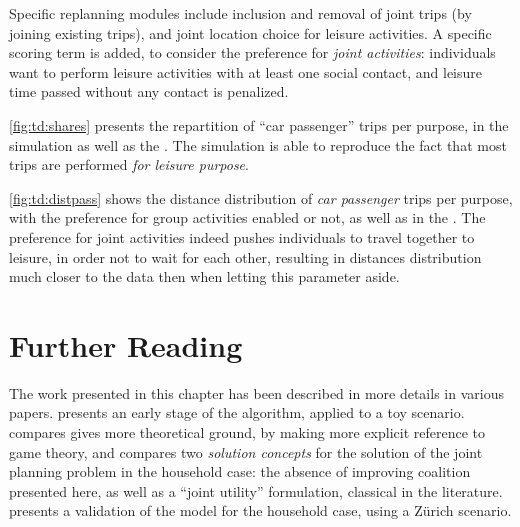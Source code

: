 {Specific replanning modules include inclusion and removal of joint trips (by joining existing trips),
and joint location choice for leisure activities.
A specific scoring term is added, to consider the preference for \emph{joint activities}:
individuals want to perform leisure activities with at least one social contact,
and leisure time passed without any contact is penalized.

\cref{fig:td:shares} presents the repartition of ``car passenger'' trips per purpose,
in the simulation as well as the \mz.
The simulation is able to reproduce the fact that most trips are performed
\emph{for leisure purpose}.


\cref{fig:td:distpass} shows the distance distribution of \emph{car passenger} trips per purpose,
with the preference for group activities enabled or not, as well as in the \mz.
The preference for joint activities indeed pushes individuals to travel together to leisure,
in order not to wait for each other, resulting in distances distribution much closer to the
\mz data then when letting this parameter aside.


\section{Further Reading}
The work presented in this chapter has been described in more details in various papers.
presents an early stage of the algorithm, applied to a toy scenario.
compares gives more theoretical ground,
by making more explicit reference to game theory,
and compares two \emph{solution concepts} for
the solution of the joint planning problem in the household case:
the absence of improving coalition presented here,
as well as a ``joint utility'' formulation,
classical in the literature.
presents a validation of the model for the household case,
using a Zürich scenario.

} %
